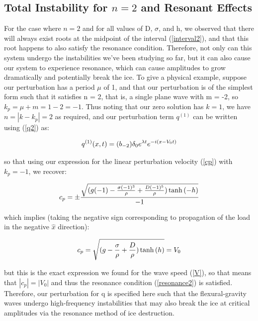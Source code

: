 \documentclass{article}
\begin{document}
\subsection{Total Instability for \(n = 2\) and Resonant Effects}
For the case where \(n = 2\) and for all values of D, \(\sigma\), and h, we observed that there will always exist roots at the midpoint of the interval (\ref{interval2}), and that this root happens to also satisfy the resonance condition. Therefore, not only can this system undergo the instabilities we've been studying so far, but it can also cause our system to experience resonance, which can cause amplitudes to grow dramatically and potentially break the ice. To give a physical example, suppose our perturbation has a period \(\mu\) of 1, and that our perturbation is of the simplest form such that it satisfies n = 2, that is, a single plane wave with m = -2, so \( k_{p} = \mu + m = 1 - 2 = -1\). Thus noting that our zero solution has \( k = 1\), we have \(n = |k - k_{p}| = 2\) as required, and our perturbation term \(q^{(1)}\) can be written using (\ref{q2}) as:

\begin{equation} \label{q3}
  q^{(1)}(x,t) = (b_{-2})\delta_{0}e^{\lambda t}e^{-i(x-V_{0}t)}
\\
\end{equation} 

so that using our expression for the linear perturbation velocity (\ref{cp}) with \(k_p = -1\), we recover:

\begin{equation} \label{cp}
  c_{p} = \pm \frac{\sqrt{(g(-1) - \frac{\sigma(-1)^3}{\rho} + \frac{D(-1)^5}{\rho})\tanh{(-h)}}}{-1} 
\\
\end{equation} 

which implies (taking the negative sign corresponding to propagation of the load in the negative \(\hat{x}\) direction):

\begin{equation} \label{cp2}
  c_{p} = \sqrt{(g - \frac{\sigma }{\rho} + \frac{D }{\rho})\tanh{(h)}} = V_{0}
\\
\end{equation} 

but this is the exact expression we found for the wave speed (\ref{V}), so that means that \(|c_{p}| = |V_0|\) and thus the resonance condition (\ref{resonance2}) is satisfied. Therefore, our perturbation for q is specified here such that the flexural-gravity waves undergo high-frequency instabilities that may also break the ice at critical amplitudes via the resonance method of ice destruction.
\\
\\
\end{document}
